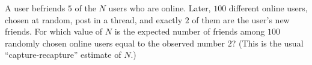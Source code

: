 A user befriends $5$ of the $N$ users who are online. Later, $100$ different online users, chosen at random, post in a thread, and exactly $2$ of them are the user's new friends. For which value of $N$ is the expected number of friends among $100$ randomly chosen online users equal to the observed number $2$? (This is the usual ``capture-recapture'' estimate of $N$.)
